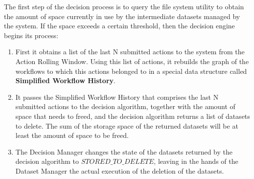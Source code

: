 The first step of the decision process is to query the file system utility to obtain the amount of space currently in use by the intermediate datasets managed by the system. If the space exceeds a certain threshold, then the decision engine begins its process:

\begin{enumerate}
\item First it obtains a list of the last N submitted actions to the system from the Action Rolling Window. Using this list of actions, it rebuilds the graph of the workflows to which this actions belonged to in a special data structure called \textbf{Simplified Workflow History}.
\item It passes the Simplified Workflow History that comprises the last N submitted actions to the decision algorithm, together with the amount of space that needs to freed, and the decision algorithm returns a list of datasets to delete. The sum of the storage space of the returned datasets will be at least the amount of space to be freed.
\item The Decision Manager changes the state of the datasets returned by the decision algorithm to $STORED\_TO\_DELETE$, leaving in the hands of the Dataset Manager the actual execution of the deletion of the datasets.
\end{enumerate}

